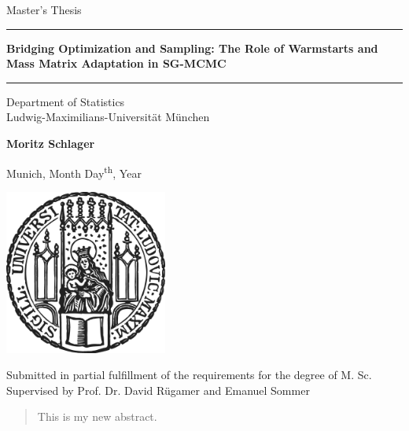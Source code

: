 \documentclass[12pt]{article}
\newcommand{\mytitle}{Bridging Optimization and Sampling: The Role of Warmstarts and Mass Matrix Adaptation in SG-MCMC}
\newcommand{\myname}{Moritz Schlager}
\newcommand{\mysupervisor}{Prof. Dr. David Rügamer and Emanuel Sommer}
\begin{document}

\begin{titlepage}
  \begin{center}

    \LARGE
    Master's Thesis

    \vspace{0.5cm}

    \rule{\textwidth}{1.5pt}
    \LARGE
    \textbf{\mytitle}
    \rule{\textwidth}{1.5pt}

    \vspace{0.5cm}

    \large
    Department of Statistics \\
    Ludwig-Maximilians-Universität München

    \vfill

    \Large
    \textbf{\myname}

    \vfill

    \large
    Munich, Month Day\textsuperscript{th}, Year

    \vfill

    \includegraphics[width = 0.4\textwidth]{sigillum.png}

    \vfill

    \normalsize
    Submitted in partial fulfillment of the requirements for the degree of M. Sc.
    \\

    Supervised by \mysupervisor

  \end{center}
\end{titlepage}


\newpage

\begin{abstract}

  This is my new abstract.

\end{abstract}
\end{document}
